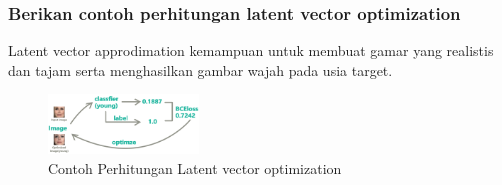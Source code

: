 \subsubsection{Berikan contoh perhitungan latent vector optimization}
\hfill \break
Latent vector approdimation kemampuan untuk membuat gamar yang realistis dan tajam serta menghasilkan gambar wajah pada usia target.
	\begin{figure}[H]
		\includegraphics[width=4cm]{figures/1174057/chapter9/9.png}
		\centering
		\caption{Contoh Perhitungan Latent vector optimization}
	\end{figure}

